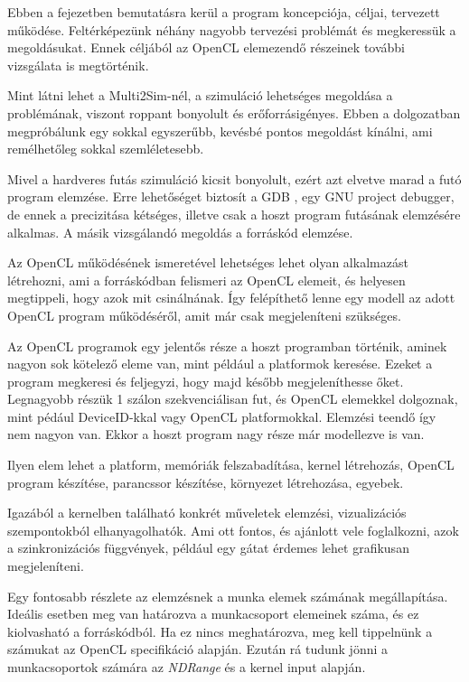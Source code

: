 
Ebben a fejezetben bemutatásra kerül a program koncepciója, céljai, tervezett működése. Feltérképezünk néhány nagyobb tervezési problémát és megkeressük a megoldásukat. Ennek céljából az OpenCL elemezendő részeinek további vizsgálata is megtörténik.

Mint látni lehet a Multi2Sim-nél, a szimuláció lehetséges megoldása a problémának, viszont roppant bonyolult és erőforrásigényes. Ebben a dolgozatban megpróbálunk egy sokkal egyszerűbb, kevésbé pontos megoldást kínálni, ami remélhetőleg sokkal szemléletesebb. 

Mivel a hardveres futás szimuláció kicsit bonyolult, ezért azt elvetve marad a futó program elemzése. Erre lehetőséget biztosít a GDB \cite{gdb}, egy GNU project debugger, de ennek a precizitása kétséges, illetve csak a hoszt program futásának elemzésére alkalmas. A másik vizsgálandó megoldás a forráskód elemzése.

Az OpenCL működésének ismeretével lehetséges lehet olyan alkalmazást létrehozni, ami a forráskódban felismeri az OpenCL elemeit, és helyesen megtippeli, hogy azok mit csinálnának. Így felépíthető lenne egy modell az adott OpenCL program működéséről, amit már csak megjeleníteni szükséges.
 
Az OpenCL programok egy jelentős része a hoszt programban történik, aminek nagyon sok kötelező eleme van, mint például a platformok keresése. Ezeket a program megkeresi és feljegyzi, hogy majd később megjeleníthesse őket. Legnagyobb részük 1 szálon szekvenciálisan fut, és OpenCL elemekkel dolgoznak, mint pédául DeviceID-kkal vagy OpenCL platformokkal. Elemzési teendő így nem nagyon van. Ekkor a hoszt program nagy része már modellezve is van.

Ilyen elem lehet a platform, memóriák felszabadítása, kernel létrehozás, OpenCL program készítése, parancssor készítése, környezet létrehozása, egyebek.



Igazából a kernelben található konkrét műveletek elemzési, vizualizációs szempontokból elhanyagolhatók. Ami ott fontos, és ajánlott vele foglalkozni, azok a szinkronizációs függvények, például egy gátat érdemes lehet grafikusan megjeleníteni.

Egy fontosabb részlete az elemzésnek a munka elemek számának megállapítása. Ideális esetben meg van határozva a munkacsoport elemeinek száma, és ez kiolvasható a forráskódból. Ha ez nincs meghatározva, meg kell tippelnünk a számukat az OpenCL specifikáció alapján. Ezután rá tudunk jönni a munkacsoportok számára az \textit{NDRange} és a kernel input alapján.

